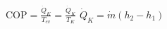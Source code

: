 \( \text{COP} = \frac{\dot{Q}_K}{T_{ev}} = \frac{\dot{Q}_K}{T_{K}} \)  
\( \dot{Q}_K = \dot{m} (h_2 - h_1) \)